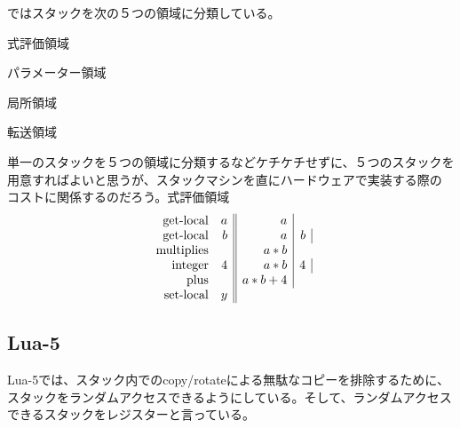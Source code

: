 {	\cite{shannon2006}ではスタックを次の５つの領域に分類している。
	\begin{description}\setlength{\itemsep}{-1mm} %
		\item[e-stack] 式評価領域
		\item[p-stack] パラメーター領域
		\item[l-stack] 局所領域
		\item[x-stack] 転送領域
		\item[その他]
	\end{description} %
	単一のスタックを５つの領域に分類するなどケチケチせずに、５つのスタックを
	用意すればよいと思うが、スタックマシンを直にハードウェアで実装する際の
	コストに関係するのだろう。式評価領域
	\begin{equation*}\begin{array}{rr||r|r|}
		{\ensuremath{\operatorname{get-local}}} & a & a \\
		{\operatorname{get-local}} & b & a & b \\
		{\operatorname{multiplies}} & & a * b \\
		{\operatorname{integer}} & 4 & a * b & 4 \\
		{\operatorname{plus}} & & a * b + 4 \\
		{\operatorname{set-local}} & y \\
	\end{array}\end{equation*}
\subsection{Lua-5}\label{s2:Lua-5} %
	Lua-5では、スタック内でのcopy/rotateによる無駄なコピーを排除するために、
	スタックをランダムアクセスできるようにしている。そして、ランダムアクセス
	できるスタックをレジスターと言っている。
}
